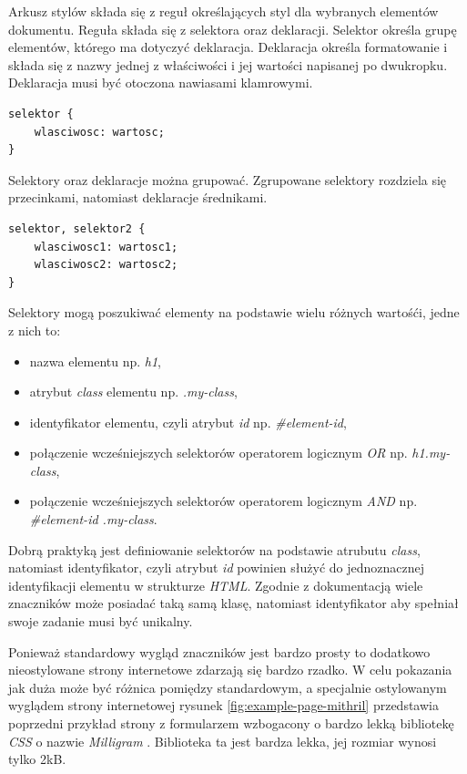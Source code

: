\documentclass[polish, twoside, 12pt]{mwart}
\begin{document}
Arkusz stylów składa się z reguł określających styl dla wybranych elementów dokumentu. Reguła składa się z selektora oraz deklaracji. Selektor określa grupę elementów, którego ma dotyczyć deklaracja. Deklaracja określa formatowanie i składa się z nazwy jednej z właściwości i jej wartości napisanej po dwukropku. Deklaracja musi być otoczona nawiasami klamrowymi.

\begin{lstlisting}
selektor { 
	wlasciwosc: wartosc; 
}
\end{lstlisting}

Selektory oraz deklaracje można grupować. Zgrupowane selektory rozdziela się przecinkami, natomiast deklaracje średnikami.

\begin{lstlisting}
selektor, selektor2 { 
	wlasciwosc1: wartosc1;
	wlasciwosc2: wartosc2;
}
\end{lstlisting}

Selektory mogą poszukiwać elementy na podstawie wielu różnych wartośći, jedne z nich to:

\begin{itemize}
  \item nazwa elementu np. \emph{h1},
  \item atrybut \emph{class} elementu np. \emph{.my-class},
  \item identyfikator elementu, czyli atrybut \emph{id} np. \emph{\#element-id},
  \item połączenie wcześniejszych selektorów operatorem logicznym \emph{OR} np. \emph{h1.my-class},
  \item połączenie wcześniejszych selektorów operatorem logicznym \emph{AND} np. \emph{\#element-id .my-class}.
\end{itemize}

Dobrą praktyką jest definiowanie selektorów na podstawie atrubutu \emph{class}, natomiast identyfikator, czyli atrybut \emph{id} powinien służyć do jednoznacznej identyfikacji elementu w strukturze \emph{HTML}. Zgodnie z dokumentacją wiele znaczników może posiadać taką samą klasę, natomiast identyfikator aby spełniał swoje zadanie musi być unikalny.

Ponieważ standardowy wygląd znaczników jest bardzo prosty to dodatkowo nieostylowane strony internetowe zdarzają się bardzo rzadko. W celu pokazania jak duża może być różnica pomiędzy standardowym, a specjalnie ostylowanym wyglądem strony internetowej rysunek \ref{fig:example-page-mithril} przedstawia poprzedni przykład strony z formularzem wzbogacony o bardzo lekką bibliotekę \emph{CSS} o nazwie \emph{Milligram} \cite{milligram}. Biblioteka ta jest bardza lekka, jej rozmiar wynosi tylko 2kB.
\end{document}
